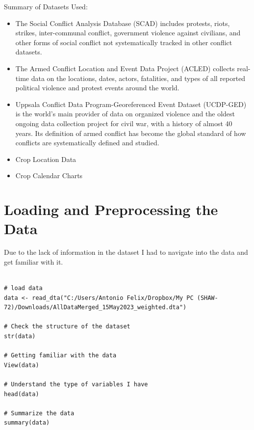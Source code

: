 \documentclass[12pt,letterpaper]{article}
\begin{document}
\noindent Summary of Datasets Used:
\begin{itemize}
\item The Social Conflict Analysis Database (SCAD) includes protests, riots, strikes, inter-communal conflict, government violence against civilians, and other forms of social conflict not systematically tracked in other conflict datasets.
\item The Armed Conflict Location and Event Data Project (ACLED) collects real-time data on the locations, dates, actors, fatalities, and types of all reported political violence and protest events around the world.
\item Uppsala Conflict Data Program-Georeferenced Event Dataset (UCDP-GED) is the world’s main provider of data on organized violence and the oldest ongoing data collection project for civil war, with a history of almost 40 years. Its definition of armed conflict has become the global standard of how conflicts are systematically defined and studied.
\item Crop Location Data
\item Crop Calendar Charts
\end{itemize}




\newpage
\section*{Loading and Preprocessing the Data}
Due to the lack of information in the dataset I had to navigate into the data and get familiar with it. 
	
\begin{lstlisting}	

# load data
data <- read_dta("C:/Users/Antonio Felix/Dropbox/My PC (SHAW-72)/Downloads/AllDataMerged_15May2023_weighted.dta")

# Check the structure of the dataset
str(data)

# Getting familiar with the data
View(data)

# Understand the type of variables I have
head(data)

# Summarize the data
summary(data)
	
\end{lstlisting}	
	
\end{document}
